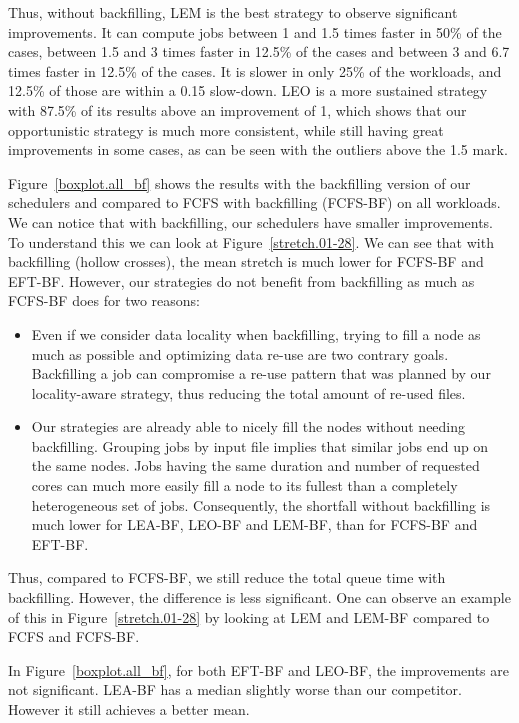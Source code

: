 \documentclass[conference,10pt]{IEEEtran}
\begin{document}
Thus, without backfilling, LEM is the best strategy to observe significant improvements.
It can compute jobs between 1 and 1.5 times faster in 50\% of the cases,
between 1.5 and 3 times faster in 12.5\% of the cases and between 3 and 6.7 times faster in 12.5\% of the cases.
It is slower in only 25\% of the workloads, and 12.5\% of those are within a 0.15 slow-down.
LEO is a more sustained strategy with 87.5\% of its results above an improvement of 1, which shows that our opportunistic
strategy is much more consistent, while still having great improvements in some cases, as can be seen with the outliers above the 1.5 mark.

Figure~\ref{boxplot.all_bf} shows the results with the backfilling version of our
schedulers and compared to FCFS with backfilling (FCFS-BF) on all workloads.
We can notice that with backfilling, our schedulers have smaller improvements.
To understand this we can look at Figure~\ref{stretch.01-28}. We can see that 
with backfilling 
(hollow crosses),
the mean stretch is much lower for FCFS-BF and EFT-BF. 
However, our strategies do not benefit from backfilling as much as FCFS-BF does for two reasons:
\begin{itemize}
	\item Even if we consider data locality when backfilling, trying to fill a node as much as possible and optimizing data re-use are two contrary goals. 
	Backfilling a job can compromise a re-use pattern that was planned by our locality-aware strategy, thus reducing the total 
	amount of re-used files.
	\item Our strategies are already able to nicely fill the nodes without needing backfilling.
	Grouping jobs by input file implies that similar jobs end up on the same nodes.
	Jobs having the same duration and number of requested cores can much more easily fill a node to its fullest than a completely heterogeneous set of jobs.
	Consequently, the shortfall without backfilling is much lower for LEA-BF, LEO-BF and LEM-BF, than for FCFS-BF and EFT-BF.
\end{itemize}
Thus, compared to FCFS-BF, we still reduce the total queue time with backfilling.
However, the difference is less significant. One can observe an example of this
in Figure~\ref{stretch.01-28} by looking at LEM and LEM-BF compared to FCFS and FCFS-BF.

In Figure~\ref{boxplot.all_bf}, for both EFT-BF and LEO-BF, the improvements are not significant.
LEA-BF has a median slightly worse than our competitor. However it still
achieves a better mean.
\end{document}
